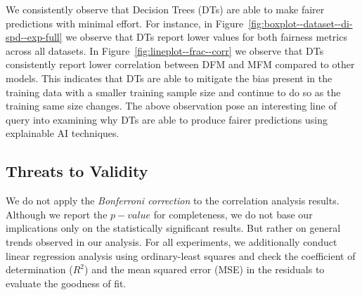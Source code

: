 \documentclass{article}
\begin{document}
We consistently observe that Decision Trees (DTs) are able to make
fairer predictions with minimal effort. For instance, in
Figure \ref{fig:boxplot--dataset--di-spd--exp-full} we observe that
DTs report lower values for both fairness metrics across all
datasets. In Figure \ref{fig:lineplot--frac--corr} we observe that DTs
consistently report lower correlation between DFM and MFM compared to
other models. This indicates that DTs are able to mitigate the bias
present in the training data with a smaller training sample size and
continue to do so as the training same size changes. The above
observation pose an interesting line of query into examining why DTs
are able to produce fairer predictions using explainable AI
techniques.

\subsection{Threats to Validity}\label{sec:threats}

We do not apply the \emph{Bonferroni correction} to the correlation
analysis results. Although we report the $p-value$ for completeness,
we do not base our implications only on the statistically significant
results. But rather on general trends observed in our analysis. For
all experiments, we additionally conduct linear regression analysis
using ordinary-least squares and check the coefficient of
determination ($R^2$) and the mean squared error (MSE) in the
residuals to evaluate the goodness of fit. 


\end{document}
